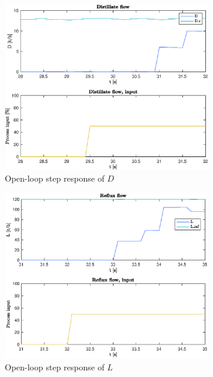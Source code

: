 \documentclass[12pt]{article}
\begin{document}
\begin{figure}
\centering
\includegraphics[width=0.8\textwidth]{../Systemanalyse/Log_Data_to_Matlab/Figurer/Stegeksperimenter/FC1005.eps}
\caption{Open-loop step response of $D$}
\label{fig:ol_step_FC1005}
\end{figure}

\begin{figure}
\centering
\includegraphics[width=0.8\textwidth]{../Systemanalyse/Log_Data_to_Matlab/Figurer/Stegeksperimenter/FC1015.eps}
\caption{Open-loop step response of $L$}
\label{fig:ol_step_FC1015}
\end{figure}
\end{document}
